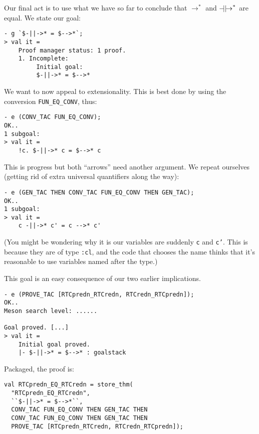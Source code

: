 Our final act is to use what we have so far to conclude that
$\rightarrow^*$ and $\mathbin{-\!\!\!\mid\mid\!\rightarrow}^*$ are equal.  We state our goal:
\begin{session}
\begin{verbatim}
- g `$-||->* = $-->*`;
> val it =
    Proof manager status: 1 proof.
    1. Incomplete:
         Initial goal:
         $-||->* = $-->*
\end{verbatim}
\end{session}
We want to now appeal to extensionality.  This is best done by using the
conversion \texttt{FUN\_EQ\_CONV}, thus:
\begin{session}
\begin{verbatim}
- e (CONV_TAC FUN_EQ_CONV);
OK..
1 subgoal:
> val it =
    !c. $-||->* c = $-->* c
\end{verbatim}
\end{session}
This is progress but both ``arrows'' need another argument.  We repeat
ourselves (getting rid of extra universal quantifiers along the way):
\begin{session}
\begin{verbatim}
- e (GEN_TAC THEN CONV_TAC FUN_EQ_CONV THEN GEN_TAC);
OK..
1 subgoal:
> val it =
    c -||->* c' = c -->* c'
\end{verbatim}
\end{session}
(You might be wondering why it is our variables are suddenly
\texttt{c} and \texttt{c'}.  This is because they are of type
\texttt{:cl}, and the code that chooses the name thinks that it's
reasonable to use variables named after the type.)

This goal is an easy consequence of our two earlier implications.
\begin{session}
\begin{verbatim}
- e (PROVE_TAC [RTCpredn_RTCredn, RTCredn_RTCpredn]);
OK..
Meson search level: ......

Goal proved. [...]
> val it =
    Initial goal proved.
    |- $-||->* = $-->* : goalstack
\end{verbatim}
\end{session}
Packaged, the proof is:
\begin{session}
\begin{verbatim}
val RTCpredn_EQ_RTCredn = store_thm(
  "RTCpredn_EQ_RTCredn",
  ``$-||->* = $-->*``,
  CONV_TAC FUN_EQ_CONV THEN GEN_TAC THEN
  CONV_TAC FUN_EQ_CONV THEN GEN_TAC THEN
  PROVE_TAC [RTCpredn_RTCredn, RTCredn_RTCpredn]);
\end{verbatim}
\end{session}


